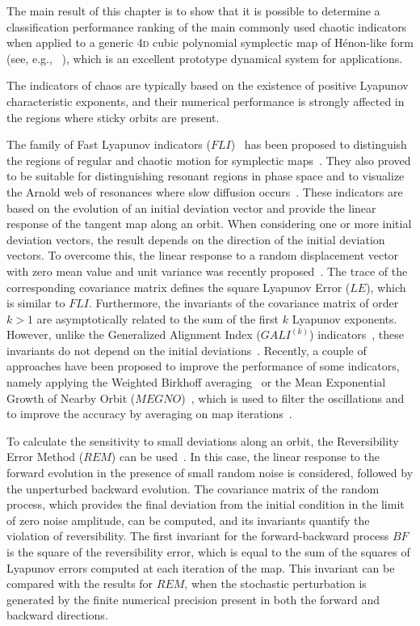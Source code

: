 The main result of this chapter is to show that it is possible to determine a classification performance ranking of the main commonly used chaotic indicators when applied to a generic 4\textsc{d} cubic polynomial symplectic map of H\'enon-like form (see, e.g., ~\cite{Bazzani:262179}), which is an excellent prototype dynamical system for applications.

The indicators of chaos are typically based on the existence of positive Lyapunov characteristic exponents, and their numerical performance is strongly affected in the regions where sticky orbits are present.

The family of Fast Lyapunov indicators ($FLI$)~\cite{Froeschle1997} has been proposed to distinguish the regions of regular and chaotic motion for symplectic maps~\cite{SZEZECH2005394}. They also proved to be suitable for distinguishing resonant regions in phase space and to visualize the Arnold web of resonances where slow diffusion occurs~\cite{Arnold:937549}. These indicators are based on the evolution of an initial deviation vector and provide the linear response of the tangent map along an orbit. When considering one or more initial deviation vectors, the result depends on the direction of the initial deviation vectors. To overcome this, the linear response to a random displacement vector with zero mean value and unit variance was recently proposed~\cite{Turchetti2017}. The trace of the corresponding covariance matrix defines the square Lyapunov Error ($LE$), which is similar to $FLI$. Furthermore, the invariants of the covariance matrix of order $k>1$ are asymptotically related to the sum of the first $k$ Lyapunov exponents. However, unlike the Generalized Alignment Index ($GALI^{(k)}$) indicators~\cite{Bountis2007,Skokos2015}, these invariants do not depend on the initial deviations~\cite{Skokos2008}. Recently, a couple of approaches have been proposed to improve the performance of some indicators, namely applying the Weighted Birkhoff averaging~\cite{Das_2017} or the Mean Exponential Growth of Nearby Orbit ($MEGNO$)~\cite{Cincotta1996}, which is used to filter the oscillations and to improve the accuracy by averaging on map iterations~\cite{Gozdziewski01,Mestre2011}.

To calculate the sensitivity to small deviations along an orbit, the Reversibility Error Method ($REM$) can be used~\cite{Panichi2016,Panichi2017}. In this case, the linear response to the forward evolution in the presence of small random noise is considered, followed by the unperturbed backward evolution. The covariance matrix of the random process, which provides the final deviation from the initial condition in the limit of zero noise amplitude, can be computed, and its invariants quantify the violation of reversibility. The first invariant for the forward-backward process $BF$ is the square of the reversibility error, which is equal to the sum of the squares of Lyapunov errors computed at each iteration of the map. This invariant can be compared with the results for $REM$, when the stochastic perturbation is generated by the finite numerical precision present in both the forward and backward directions. 

